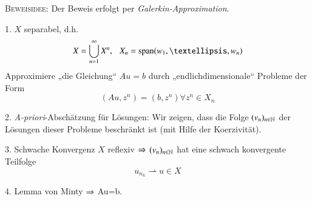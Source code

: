 \textsc{Beweisidee:} Der Beweis erfolgt per \textit{Galerkin-Approximation}.
\begin{description}
    \item{1.}
    $X$ separabel, d.h.
    \[
        X=\bigcup_{n=1}^\infty X^n, \qq X_n=\mr{span}(w_1,…,w_n)
    \]
    Approximiere „die Gleichung“ $Au=b$ durch „endlichdimensionale“ Probleme der Form
    \[
        (Au,z^n)=(b,z^n)    \forall z^n\in X_n
    \]
    \item{2. \textit{A-priori}-Abschätzung für Lösungen:}
    Wir zeigen, dass die Folge $(v_n)_{n\in \mathbb{N}}$ der Lösungen dieser Probleme beschränkt ist (mit Hilfe
            der Koerzivität).
    \item{3. Schwache Konvergenz}
    $X$ reflexiv $\Rightarrow$ $(v_n)_{n\in \mathbb{N}}$ hat eine schwach konvergente Teilfolge
    \[
        u_{n_k}\rightharpoonup u \in X
    \]
    \item{4.}
    Lemma von Minty $\Rightarrow$ Au=b.
    
\end{description}
